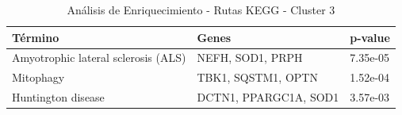 \begin{table}[H]
	\centering
	\caption{Análisis de Enriquecimiento - Rutas KEGG - Cluster 3}
	\label{tb:c2_t4}
	\begin{tabular}{|p{4cm}|p{4cm}|p{3cm}|}
		\hline
		\textbf{Término} & \textbf{Genes} & \textbf{p-value} \\ \hline
		Amyotrophic lateral sclerosis (ALS) & NEFH, SOD1, PRPH & 7.35e-05 \\ \hline
		Mitophagy & TBK1, SQSTM1, OPTN & 1.52e-04 \\ \hline
		Huntington disease & DCTN1, PPARGC1A, SOD1 & 3.57e-03 \\ \hline
	\end{tabular}
\end{table}






